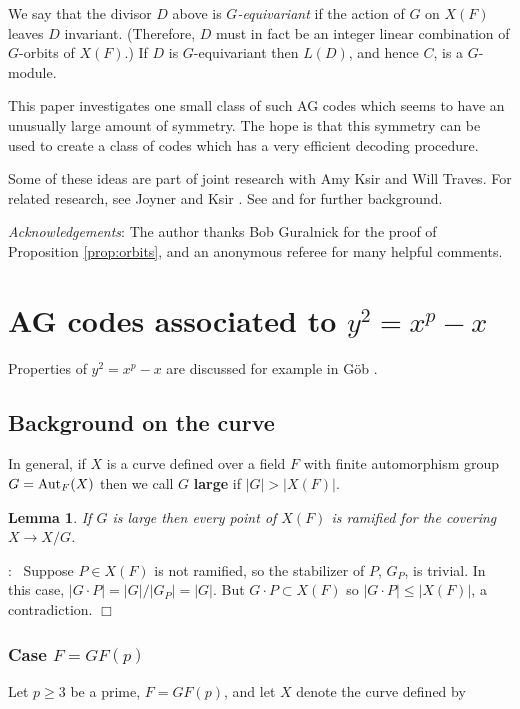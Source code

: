 \documentclass[12pt]{article}
\newtheorem{lemma}[theorem]{Lemma}
\numberwithin{equation}{section}
\def\Aut{{\rm{Aut}}}
\def\pf{\noindent {\bf Proof}:\ }
\def\qed{$\Box$}
\begin{document}
We say that the divisor $D$ above is {\it $G$-equivariant}
if the action of $G$ on $X(F)$ leaves $D$ invariant.
(Therefore, $D$ must in fact be an integer linear combination
of $G$-orbits of $X(F)$.) If $D$ is $G$-equivariant
then $L(D)$, and hence $C$, is a $G$-module.

This paper investigates one small class of such AG codes
which seems to have an unusually large amount of
symmetry. The hope is that this symmetry can be used to 
create a class of codes which has a very efficient
decoding procedure.

Some of these ideas are part of joint research with 
Amy Ksir and Will Traves.
For related research, see Joyner and Ksir \cite{JK1}.
See \cite{JK2} and \cite{JT} for further background.

{\it Acknowledgements}: The author thanks Bob
Guralnick for the proof of Proposition \ref{prop:orbits}, 
and an anonymous referee for many helpful
comments.

\section{AG codes associated to $y^2=x^p-x$}

Properties of $y^2=x^p-x$ are discussed for example in 
G\"ob \cite{G}.

\subsection{Background on the curve}

In general, if $X$ is a curve defined over a field $F$
with finite automorphism group $G=\Aut_F(X)$ then we call
$G$ {\bf large} if $|G|>|X(F)|$.

\begin{lemma}
\label{lemma:large}
If $G$ is large then every point of $X(F)$
is ramified for the covering $X\rightarrow X/G$.
\end{lemma}

\pf
Suppose $P\in X(F)$ is not ramified, so the stabilizer of $P$,
$G_P$, is trivial. In this case,
$|G\cdot P|= |G|/|G_P|= |G|$. But $G\cdot P\subset X(F)$
so $|G\cdot P|\leq |X(F)|$, a contradiction. \qed

\subsubsection{Case $F=GF(p)$}
\label{sec:F=GF(p)}

Let $p\geq 3$ be a prime,
$F=GF(p)$, and let $X$ denote the curve defined by
\end{document}

